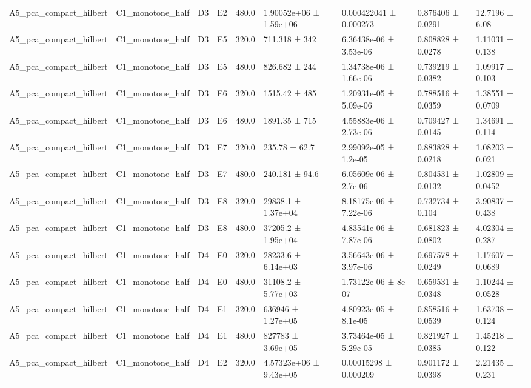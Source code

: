 \begin{table}
\begin{tabular}{lllllllll}
A5\_pca\_compact\_hilbert & C1\_monotone\_half & D3 & E2 & 480.0 & 1.90052e+06 ± 1.59e+06 & 0.000422041 ± 0.000273 & 0.876406 ± 0.0291 & 12.7196 ± 6.08 \\
A5\_pca\_compact\_hilbert & C1\_monotone\_half & D3 & E5 & 320.0 & 711.318 ± 342 & 6.36438e-06 ± 3.53e-06 & 0.808828 ± 0.0278 & 1.11031 ± 0.138 \\
A5\_pca\_compact\_hilbert & C1\_monotone\_half & D3 & E5 & 480.0 & 826.682 ± 244 & 1.34738e-06 ± 1.66e-06 & 0.739219 ± 0.0382 & 1.09917 ± 0.103 \\
A5\_pca\_compact\_hilbert & C1\_monotone\_half & D3 & E6 & 320.0 & 1515.42 ± 485 & 1.20931e-05 ± 5.09e-06 & 0.788516 ± 0.0359 & 1.38551 ± 0.0709 \\
A5\_pca\_compact\_hilbert & C1\_monotone\_half & D3 & E6 & 480.0 & 1891.35 ± 715 & 4.55883e-06 ± 2.73e-06 & 0.709427 ± 0.0145 & 1.34691 ± 0.114 \\
A5\_pca\_compact\_hilbert & C1\_monotone\_half & D3 & E7 & 320.0 & 235.78 ± 62.7 & 2.99092e-05 ± 1.2e-05 & 0.883828 ± 0.0218 & 1.08203 ± 0.021 \\
A5\_pca\_compact\_hilbert & C1\_monotone\_half & D3 & E7 & 480.0 & 240.181 ± 94.6 & 6.05609e-06 ± 2.7e-06 & 0.804531 ± 0.0132 & 1.02809 ± 0.0452 \\
A5\_pca\_compact\_hilbert & C1\_monotone\_half & D3 & E8 & 320.0 & 29838.1 ± 1.37e+04 & 8.18175e-06 ± 7.22e-06 & 0.732734 ± 0.104 & 3.90837 ± 0.438 \\
A5\_pca\_compact\_hilbert & C1\_monotone\_half & D3 & E8 & 480.0 & 37205.2 ± 1.95e+04 & 4.83541e-06 ± 7.87e-06 & 0.681823 ± 0.0802 & 4.02304 ± 0.287 \\
A5\_pca\_compact\_hilbert & C1\_monotone\_half & D4 & E0 & 320.0 & 28233.6 ± 6.14e+03 & 3.56643e-06 ± 3.97e-06 & 0.697578 ± 0.0249 & 1.17607 ± 0.0689 \\
A5\_pca\_compact\_hilbert & C1\_monotone\_half & D4 & E0 & 480.0 & 31108.2 ± 5.77e+03 & 1.73122e-06 ± 8e-07 & 0.659531 ± 0.0348 & 1.10244 ± 0.0528 \\
A5\_pca\_compact\_hilbert & C1\_monotone\_half & D4 & E1 & 320.0 & 636946 ± 1.27e+05 & 4.80923e-05 ± 8.1e-05 & 0.858516 ± 0.0539 & 1.63738 ± 0.124 \\
A5\_pca\_compact\_hilbert & C1\_monotone\_half & D4 & E1 & 480.0 & 827783 ± 3.69e+05 & 3.73464e-05 ± 5.29e-05 & 0.821927 ± 0.0385 & 1.45218 ± 0.122 \\
A5\_pca\_compact\_hilbert & C1\_monotone\_half & D4 & E2 & 320.0 & 4.57323e+06 ± 9.43e+05 & 0.00015298 ± 0.000209 & 0.901172 ± 0.0398 & 2.21435 ± 0.231 \\

\end{tabular}
\end{table}

